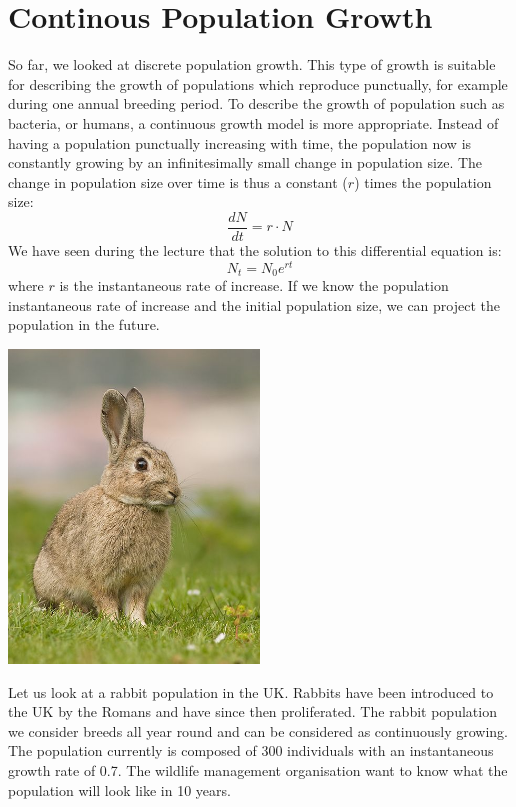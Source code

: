 \documentclass{article}\usepackage[]{graphicx}\usepackage[]{color}
\begin{document}
\section{Continous Population Growth}
So far, we looked at discrete population growth. This type of growth is suitable for describing the growth of populations which reproduce punctually, for example during one annual breeding period. To describe the growth of population such as bacteria, or humans, a continuous growth model is more appropriate. Instead of having a population punctually increasing with time, the population now is constantly growing by an infinitesimally small change in population size. The change in population size over time is thus a constant ($r$) times the population size:
\begin{equation}
\frac{dN}{dt} = r\cdot N
\end{equation}
We have seen during the lecture that the solution to this differential equation is: 
\begin{equation}
N_t=N_0e^{rt} \label{eqdiff}
\end{equation}
\noindent where $r$ is the instantaneous rate of increase. If we know the population instantaneous rate of increase and the initial population size, we can project the population in the future.  
\vspace{1.5ex}
\begin{center}
\includegraphics[width=0.5\textwidth]{Rabbit.jpg}
\end{center}

\noindent Let us look at a rabbit population in the UK. Rabbits have been introduced to the UK by the Romans and have since then proliferated. The rabbit population we consider breeds all year round and can be considered as continuously growing. The population currently is composed of 300 individuals with an instantaneous growth rate of 0.7. The wildlife management organisation want to know what the population will look like in 10 years.
\end{document}
